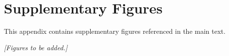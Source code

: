 \documentclass[../main.tex]{subfiles}
\begin{document}
\chapter{Supplementary Figures}

This appendix contains supplementary figures referenced in the main text.

\textit{[Figures to be added.]}
\end{document}
